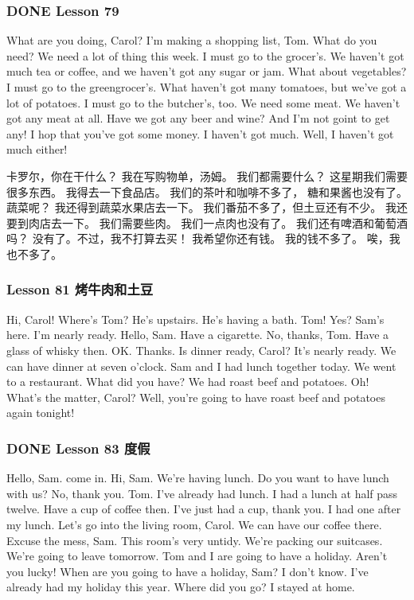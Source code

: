 \documentclass[11pt]{ctexart}
\begin{document}
\subsubsection{{\bfseries\sffamily DONE} Lesson 79}
\label{sec:org1441c28}
What are you doing, Carol?
I'm making a shopping list, Tom.
What do you need?
We need a lot of thing this week.
I must go to the grocer's.
We haven't got much tea or coffee,
and we haven't got any sugar or jam.
What about vegetables?
I must go to the greengrocer's.
What haven't got many tomatoes,
but we've got a lot of potatoes.
I must go to the butcher's, too.
We need some meat.
We haven't got any meat at all.
Have we got any beer and wine?
And I'm not goint to get any!
I hop that you've got some money.
I haven't got much.
Well, I haven't got much either!

卡罗尔，你在干什么？
我在写购物单，汤姆。
我们都需要什么？
这星期我们需要很多东西。
我得去一下食品店。
我们的茶叶和咖啡不多了，
糖和果酱也没有了。
蔬菜呢？
我还得到蔬菜水果店去一下。
我们番茄不多了，但土豆还有不少。
我还要到肉店去一下。
我们需要些肉。
我们一点肉也没有了。
我们还有啤酒和葡萄酒吗？
没有了。不过，我不打算去买！
我希望你还有钱。
我的钱不多了。
唉，我也不多了。
\subsubsection{Lesson 81 烤牛肉和土豆}
\label{sec:org57e6461}
Hi, Carol! Where's Tom?
He's upstairs.
He's having a bath.
Tom! Yes?
Sam's here.
I'm nearly ready.
Hello, Sam.
Have a cigarette.
No, thanks, Tom.
Have a glass of whisky then.
OK. Thanks.
Is dinner ready, Carol?
It's nearly ready.
We can have dinner at seven o'clock.
Sam and I had lunch together today.
We went to a restaurant.
What did you have?
We had roast beef and potatoes.
Oh!
What's the matter, Carol?
Well, you're going to have roast beef and potatoes again tonight!
\subsubsection{{\bfseries\sffamily DONE} Lesson 83 度假}
\label{sec:org1bc0885}
Hello, Sam. come in.
Hi, Sam.
We're having lunch.
Do you want to have lunch with us?
No, thank you. Tom.
I've already had lunch.
I had a lunch at half pass twelve.
Have a cup of coffee then.
I've just had a cup, thank you.
I had one after my lunch.
Let's go into the living room, Carol.
We can have our coffee there.
Excuse the mess, Sam.
This room's very untidy.
We're packing our suitcases.
We're going to leave tomorrow.
Tom and I are going to have a holiday.
Aren't you lucky!
When are you going to have a holiday, Sam?
I don't know.
I've already had my holiday this year.
Where did you go?
I stayed at home.
\end{document}
